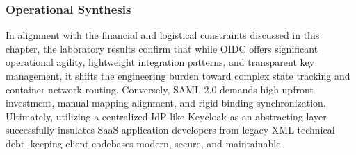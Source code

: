 \documentclass[../memoire.tex]{subfiles}
\begin{document}
\subsubsection{Operational Synthesis}

In alignment with the financial and logistical constraints discussed in this chapter, the laboratory results confirm that while OIDC offers significant operational agility, lightweight integration patterns, and transparent key management, it shifts the engineering burden toward complex state tracking and container network routing. Conversely, SAML 2.0 demands high upfront investment, manual mapping alignment, and rigid binding synchronization. Ultimately, utilizing a centralized IdP like Keycloak as an abstracting layer successfully insulates SaaS application developers from legacy XML technical debt, keeping client codebases modern, secure, and maintainable.
\end{document}
